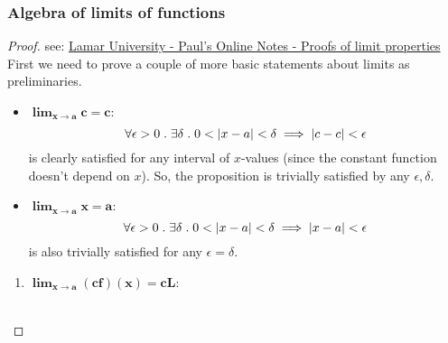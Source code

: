 \documentclass[../MathsNotesBase.tex]{subfiles}
\begin{document}
{		\bigskip
		\subsubsection{Algebra of limits of functions}
		\begin{proof}
			see: \href{http://tutorial.math.lamar.edu/Classes/CalcI/LimitProofs.aspx}{Lamar University - Paul's Online Notes - Proofs of limit properties}
			First we need to prove a couple of more basic statements about limits as preliminaries.
			\begin{itemize}
				\item{${\bm{ \lim_{x \to a} c = c }}$:\\
					\[ \forall \epsilon > 0 \;.\; \exists \delta \;.\; 0 < \left\lvert x - a\right\rvert < \delta \implies \left\lvert c - c\right\rvert < \epsilon \]
					is clearly satisfied for any interval of $x$-values (since the constant function doesn't depend on $x$). So, the proposition is trivially satisfied by any ${ \epsilon,\delta }$.
				}
				\item{${\bm{ \lim_{x \to a} x = a }}$:\\
					\[ \forall \epsilon > 0 \;.\; \exists \delta \;.\; 0 < \left\lvert x - a\right\rvert < \delta \implies \left\lvert x - a\right\rvert < \epsilon \]
					is also trivially satisfied for any ${ \epsilon = \delta }$.
				}
			\end{itemize}
			\bigskip
			\begin{enumerate}[label=(\roman*)]
				\item{${\bm{ \lim_{x \to a} (cf)(x) = cL }}$:\\\\
}
\end{enumerate}
\end{proof}}
\end{document}
